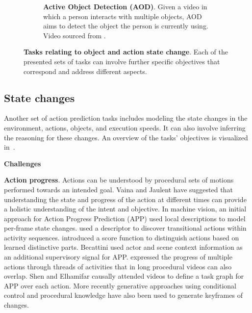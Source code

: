 \documentclass[smallextended,twocolumn,natbib]{svjour3}
\begin{document}
\begin{figure}[t]
\begin{subfigure}{\linewidth}
\caption{\textbf{Active Object Detection (AOD)}. Given a video in which a person interacts with multiple objects, AOD aims to detect the object the person is currently using. Video sourced from \citep{ragusa2021meccano}.}
\end{subfigure}
\caption{\textbf{Tasks relating to object and action state change}. Each of the presented sets of tasks can involve further specific objectives that correspond and address different aspects.}
\label{fig:state_changes}
\end{figure}

\subsection{State changes}

Another set of action prediction tasks includes modeling the state changes in the environment, actions, objects, and execution speeds. It can also involve inferring the reasoning for these changes. An overview of the tasks' objectives is visualized in~.

\noindent
\textbf{Challenges}

\noindent
\textbf{Action progress}. Actions can be understood by procedural sets of motions performed towards an intended goal. Vaina and Jaulent \citep{vaina1991object} have suggested that understanding the state and progress of the action at different times can provide a holistic understanding of the intent and objective. In machine vision, an initial approach for Action Progress Prediction (APP)  \citep{fathi2013modeling} used local descriptions to model per-frame state changes. \citep{kataoka2016recognition} used a descriptor to discover transitional actions within activity sequences. \citet{xiong2017pursuit} introduced a score function to distinguish actions based on learned distinctive parts. Becattini \citep{becattini2020done} used actor and scene context information as an additional supervisory signal for APP. \citet{price2022unweavenet} expressed the progress of multiple actions through threads of activities that in long procedural videos can also overlap. Shen and Elhamifar \citep{shen2024progress} causally attended videos to define a task graph for APP over each action. More recently generative approaches \citep{damen2024genhowto} using conditional control \citep{zhang2023adding} and procedural knowledge \citep{ashutosh2024video,zhou2023procedure} have also been used to generate keyframes of changes. 
\end{document}
